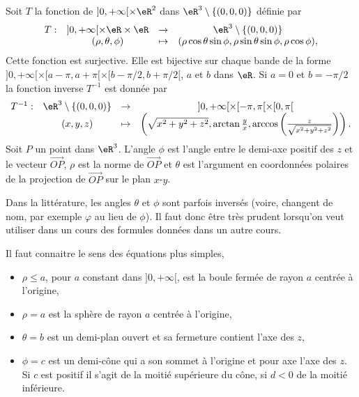 	Soit \( T\) la fonction de \( ]0, +\infty[\times \eR^2\) dans \( \eR^3\setminus\{(0,0,0)\}\) définie par
	\begin{equation}
		\begin{array}{lccc}
			T: & ]0, +\infty[\times \eR\times \eR & \to     & \eR^3\setminus\{(0,0,0)\}                                             \\
			   & (\rho, \theta, \phi)             & \mapsto & (\rho\cos \theta\sin \phi, \rho \sin \theta\sin \phi, \rho\cos \phi),
		\end{array}
	\end{equation}
	Cette fonction est surjective. Elle est bijective sur chaque bande de la forme  \( ]0, +\infty[\times [a-\pi,a+\pi[\times [b-\pi/2, b+\pi/2[\), \( a\) et \( b\) dans \( \eR\).  Si \( a =0\) et \( b=-\pi/2\) la fonction inverse \( T^{-1}\) est donnée par
\begin{equation}
	\begin{array}{lccc}
		T^{-1}: & \eR^3\setminus\{(0,0,0)\} & \to     & ]0, +\infty[\times [-\pi,\pi[\times [0, \pi[                                                             \\
		        & (x,y,z)                   & \mapsto & \left(\sqrt{x^2+y^2+z^2}, \arctan \frac{y}{x}, \arccos \left(\frac{z}{\sqrt{x^2+y^2+z^2}}\right)\right).
	\end{array}
\end{equation}
Soit \(  P\) un point dans \( \eR^3\). L'angle \( \phi\) est l'angle entre le demi-axe positif des \( z\) et le vecteur \( \overrightarrow{OP}\), \( \rho\) est la norme de \( \overrightarrow{OP}\) et \( \theta\) est l'argument en coordonnées polaires de la projection de \( \overrightarrow{OP}\) sur le plan \( x\)-\( y\).

\begin{remark}
	Dans la littérature, les angles \( \theta\) et \( \phi\) sont parfois inversés (voire, changent de nom, par exemple \( \varphi\) au lieu de \( \phi\)). Il faut donc être très prudent lorsqu'on veut utiliser dans un cours des formules données dans un autre cours.
\end{remark}

\begin{example}
	Il faut connaitre le sens des équations plus simples,
	\begin{itemize}
		\item \( \rho\leq a\), pour \( a\) constant dans  \( ]0, +\infty[\), est la boule fermée de rayon \( a\) centrée à l'origine,
		\item \( \rho= a\) est  la sphère de rayon \( a\) centrée à l'origine,
		\item \( \theta = b\) est un demi-plan ouvert et sa fermeture contient l'axe des \( z\),
		\item \( \phi= c\) est un demi-cône qui a  son sommet à l'origine et  pour axe l'axe des \( z\).  Si \( c\) est positif  il s'agit  de la moitié supérieure du cône, si \( d<0\) de la moitié inférieure.
	\end{itemize}
\end{example}

